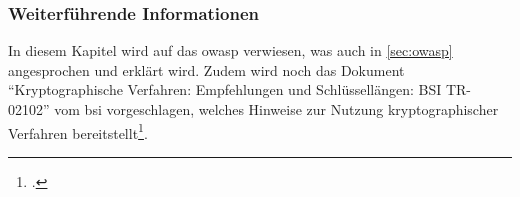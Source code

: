 \subsubsection{Weiterführende Informationen}
	\label{subsubsec:weiterfuhrende-informationen-app.3.1-webanwendungen-und-webservices}
	In diesem Kapitel wird auf das \gls{owasp} verwiesen,
	was auch in \vref{sec:owasp} angesprochen und erklärt wird.
	Zudem wird noch das Dokument
	\enquote{Kryptographische Verfahren: Empfehlungen und Schlüssellängen: BSI TR-02102}
	vom \gls{bsi} vorgeschlagen,
	welches Hinweise zur Nutzung kryptographischer Verfahren
	bereitstellt\footcite[Vgl.][APP.3.4 S.6]{holgerschildt2022}.
